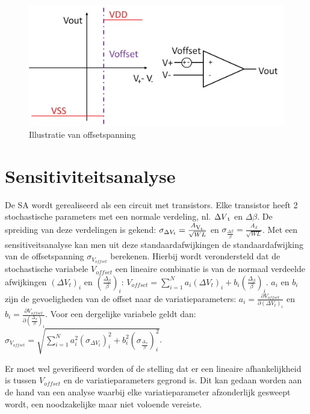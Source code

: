 \begin{figure}
  \centering
  \includegraphics[scale=0.4]{../fig/hfdstk-sensamp-offset.png}
  \caption[SA offsetspanning]{Illustratie van offsetspanning}
  \label{fig:offset}
\end{figure}

\section{Sensitiviteitsanalyse}
De SA wordt gerealiseerd als een circuit met transistors. Elke transistor heeft 2 stochastische parameters met een normale verdeling, nl. $\Delta V\textsubscript{t}$ en $\Delta \beta$. De spreiding van deze verdelingen is gekend: $\sigma_{\Delta V_{t}} = \frac{A\textsubscript{V\textsubscript{t}}}{\sqrt{W L}}$ en $\sigma_\frac{{\Delta \beta}}{\beta} = \frac{A_{\beta}}{\sqrt{W L}}$. Met een sensitiveitsanalyse kan men uit deze standaardafwijkingen de standaardafwijking van de offsetspanning $\sigma_{V_{offset}}$ berekenen. Hierbij wordt verondersteld dat de stochastische variabele $V_{offset}$ een lineaire combinatie is van de normaal verdeelde afwijkingen $(\Delta V_{t})_{i}$ en $(\frac{\Delta_{\beta}}{\beta})_{i}$: $V_{offset}=\sum\limits_{i=1}^{N} a_{i} (\Delta V_{t})_{i} + b_{i} (\frac{\Delta_{\beta}}{\beta})_{i}$.
$a_{i}$ en $b_{i}$ zijn de gevoeligheden van de offset naar de variatieparameters: $a_{i}=\frac{\partial V_{offset}}{\partial (\Delta V_{t})_{i}}$ en $b_{i}=\frac{\partial V_{offset}}{\partial (\frac{\Delta_{\beta}}{\beta})_{i}}$.
Voor een dergelijke variabele geldt dan: $\sigma_{V_{offset}}=\sqrt{\sum\limits_{i=1}^{N} a_{i}^{2} (\sigma_{\Delta V_{t}})_{i}^{2} + b_{i}^{2} (\sigma_{\frac{\Delta_{\beta}}{\beta}})_{i}^{2}}$.

Er moet wel geverifieerd worden of de stelling dat er een lineaire afhankelijkheid is tussen $V_{offset}$ en de variatieparameters gegrond is.
Dit kan gedaan worden aan de hand van een analyse waarbij elke variatieparameter afzonderlijk gesweept wordt, een noodzakelijke maar niet voloende vereiste.

